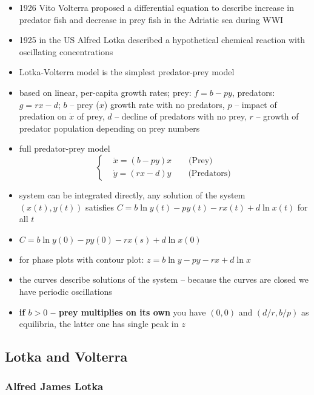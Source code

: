 \documentclass[a4paper,reqno,11pt]{article}
\begin{document}
\begin{itemize}
    \item 1926 Vito Volterra proposed a differential equation to describe
        increase in predator fish and decrease in prey fish in the Adriatic sea
        during WWI
    \item 1925 in the US Alfred Lotka described a hypothetical chemical
        reaction with oscillating concentrations
    \item Lotka-Volterra model is the simplest predator-prey model
    \item based on linear, per-capita growth rates; prey: $f = b - py$,
        predators: $g = rx - d$; $b$ -- prey ($x$) growth rate with no
        predators, $p$ -- impact of predation on $\dot x$ of prey, $d$ --
        decline of predators with no prey, $r$ -- growth of predator population
        depending on prey numbers
    \item full predator-prey model
        \begin{equation}\nonumber
            \left\{
            \begin{aligned}
                &\dot x = (b - py)x \qquad \text{(Prey)}\\
                &\dot y = (rx - d)y \qquad \text{(Predators)}
            \end{aligned}
            \right.
        \end{equation}
    \item system can be integrated directly, any solution of the system $(x(t),
        y(t))$ satisfies $C=b \ln y(t) - p y(t) - r x(t) + d \ln x(t)$ for all
        $t$
    \item $C = b \ln y(0) - p y(0) - r x(s) + d \ln x(0)$
    \item for phase plots with contour plot: $z = b \ln y - py - rx + d \ln x$
    \item the curves describe solutions of the system -- because the curves are
        closed we have periodic oscillations
    \item \textbf{if $b > 0$ -- prey multiplies on its own} you have $(0,0)$
        and $(d/r,b/p)$ as equilibria, the latter one has single peak in $z$
\end{itemize}

\subsection{Lotka and Volterra}

\subsubsection{Alfred James Lotka}
\end{document}
